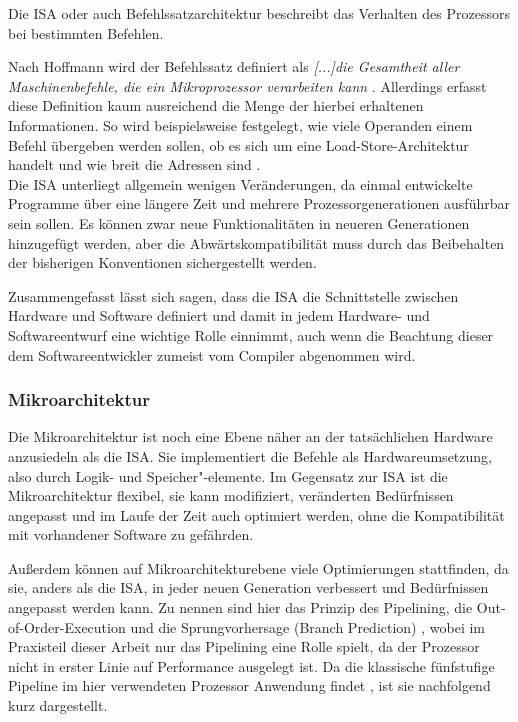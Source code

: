 \documentclass[11pt,a4paper,titlepage]{article}
\begin{document}
Die ISA oder auch Befehlssatzarchitektur beschreibt das Verhalten des Prozessors bei bestimmten Befehlen. 

Nach Hoffmann wird der Befehlssatz definiert als \textit{ [...]die Gesamtheit aller Maschinenbefehle, die ein Mikroprozessor verarbeiten kann} \cite[S. 416]{Hoffmann}. Allerdings erfasst diese Definition kaum ausreichend die Menge der hierbei erhaltenen Informationen. So wird beispielsweise festgelegt, wie viele Operanden einem Befehl übergeben werden sollen, ob es sich um eine Load-Store-Architektur handelt und wie breit die Adressen sind \cite[S. 46]{Menge}. \\

Die ISA unterliegt allgemein wenigen Veränderungen, da einmal entwickelte Programme über eine längere Zeit und mehrere Prozessorgenerationen ausführbar sein sollen. Es können zwar neue Funktionalitäten in neueren Generationen hinzugefügt werden, aber die Abwärtskompatibilität muss durch das Beibehalten der bisherigen Konventionen sichergestellt werden.

Zusammengefasst lässt sich sagen, dass die ISA die Schnittstelle zwischen Hardware und Software definiert und damit in jedem Hardware- und Softwareentwurf eine wichtige Rolle einnimmt, auch wenn die Beachtung dieser dem Softwareentwickler zumeist vom Compiler abgenommen wird.


\subsubsection{Mikroarchitektur}
\label{sec:Mikroarchitektur}

Die Mikroarchitektur ist noch eine Ebene näher an der tatsächlichen Hardware anzusiedeln als die ISA. Sie implementiert die Befehle als Hardwareumsetzung, also durch Logik- und Speicher"-elemente. Im Gegensatz zur ISA ist die Mikroarchitektur flexibel, sie kann modifiziert, veränderten Bedürfnissen angepasst und im Laufe der Zeit auch optimiert werden, ohne die Kompatibilität mit vorhandener Software zu gefährden.

Außerdem können auf Mikroarchitekturebene viele Optimierungen stattfinden, da sie, anders als die ISA, in jeder neuen Generation verbessert und Bedürfnissen angepasst werden kann. Zu nennen sind hier das Prinzip des Pipelining, die Out-of-Order-Execution und die Sprungvorhersage (Branch Prediction) \cite{Bauernoeppel}, wobei im Praxisteil dieser Arbeit nur das Pipelining eine Rolle spielt, da der Prozessor nicht in erster Linie auf Performance ausgelegt ist. Da die klassische fünfstufige Pipeline im hier verwendeten Prozessor Anwendung findet \cite[S. 55]{Boehme}, ist sie nachfolgend kurz dargestellt.
\end{document}
